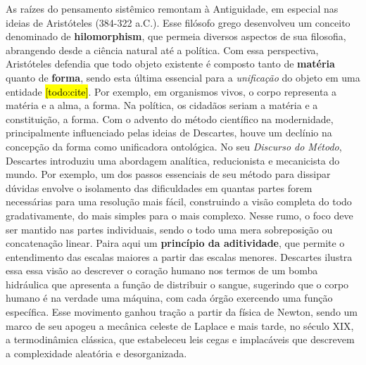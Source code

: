 \documentclass[./main.tex]{subfiles}
\begin{document}
\par As raízes do pensamento sistêmico remontam à Antiguidade, em especial nas ideias de Aristóteles (384-322 a.C.). Esse filósofo grego desenvolveu um conceito denominado de \textbf{\gls{hilomorphism}}, que permeia diversos aspectos de sua filosofia, abrangendo desde a ciência natural até a política. Com essa perspectiva, Aristóteles defendia que todo objeto existente é composto tanto de \textbf{matéria} quanto de \textbf{forma}, sendo esta última essencial para a \textit{unificação} do objeto em uma entidade \hl{[todo:cite]}. Por exemplo, em organismos vivos, o corpo representa a matéria e a alma, a forma. Na política, os cidadãos seriam a matéria e a constituição, a forma. Com o advento do método científico na modernidade, principalmente influenciado pelas ideias de Descartes, houve um declínio na concepção da forma como unificadora ontológica. No seu \textit{Discurso do Método}, Descartes introduziu uma abordagem analítica, reducionista e mecanicista do mundo. Por exemplo, um dos passos essenciais de seu método para dissipar dúvidas envolve o isolamento das dificuldades em quantas partes forem necessárias para uma resolução mais fácil, construindo a visão completa do todo gradativamente, do mais simples para o mais complexo. Nesse rumo, o foco deve ser mantido nas partes individuais, sendo o todo uma mera sobreposição ou concatenação linear. Paira aqui um \textbf{princípio da aditividade}, que permite o entendimento das escalas maiores a partir das escalas menores. Descartes ilustra essa essa visão ao descrever o coração humano nos termos de um bomba hidráulica que apresenta a função de distribuir o sangue, sugerindo que o corpo humano é na verdade uma máquina, com cada órgão exercendo uma função específica. Esse movimento ganhou tração a partir da física de Newton, sendo um marco de seu apogeu a mecânica celeste de Laplace e mais tarde, no século XIX, a termodinâmica clássica, que estabeleceu leis cegas e implacáveis que descrevem a complexidade aleatória e desorganizada.
\end{document}
